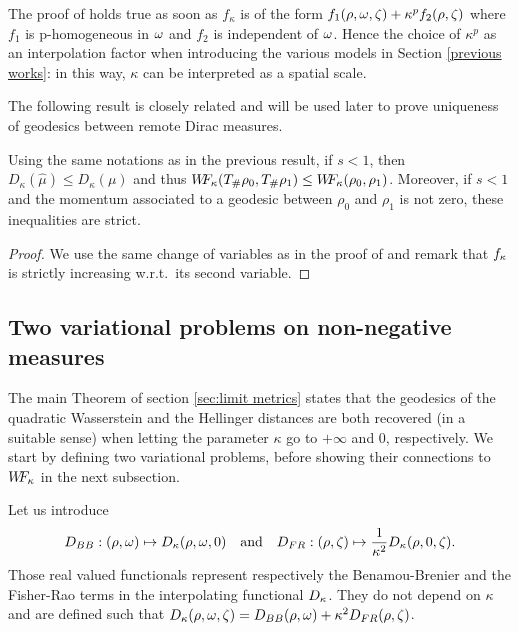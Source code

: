 \begin{remark}
The proof of  holds true as soon as $f_{\kappa}$ is of the form $f_1(\rho,\omega,\zeta)+ \kappa^p f_2(\rho,\zeta)$ where $f_1$ is p-homogeneous in $\omega$ and $f_2$ is independent of $\omega$. Hence the choice of $\kappa^p$ as an interpolation factor when introducing the various models in Section \ref{previous works}: in this way, $\kappa$ can be interpreted as a spatial scale.
\end{remark}

The following result is closely related and will be used later to prove uniqueness of geodesics between remote Dirac measures.
\begin{proposition}
Using the same notations as in the previous result, if $s<1$, then $D_{\kappa}(\hat{\mu}) \leq D_{\kappa}(\mu)$ and thus $W\! \! F_{\kappa}(T_{\#}\rho_0,T_{\#}\rho_1) \leq W\! \! F_{\kappa}(\rho_0, \rho_1)$. Moreover, if $s<1$ and the momentum associated to a geodesic between $\rho_0$ and $\rho_1$ is not zero, these inequalities are strict.
\end{proposition}

\begin{proof}
We use the same change of variables as in the proof of  and remark that $f_{\kappa}$ is strictly increasing w.r.t.\ its second variable.
\end{proof}

\subsection{Two variational problems on non-negative measures}

The main Theorem of section \ref{sec:limit metrics} states that the geodesics of the quadratic Wasserstein and the Hellinger distances are both recovered (in a suitable sense) when letting the parameter $\kappa$ go to $+\infty$ and $0$, respectively. We start by defining two variational problems, before showing their connections to $W\! \! F_{\kappa}$ in the next subsection.

Let us introduce
\[
D_{BB} : (\rho,\omega) \mapsto D_{\kappa}(\rho,\omega,0) \quad \text{and} \quad D_{FR} : (\rho,\zeta) \mapsto \frac{1}{\kappa^2}D_{\kappa}(\rho,0,\zeta).
\]
Those real valued functionals represent respectively the Benamou-Brenier and the Fisher-Rao terms in the interpolating functional $D_{\kappa}$. They do not depend on $\kappa$ and are defined such that $D_{\kappa} (\rho,\omega,\zeta)= D_{BB}(\rho,\omega)+ \kappa^2 D_{FR}(\rho,\zeta)$.

